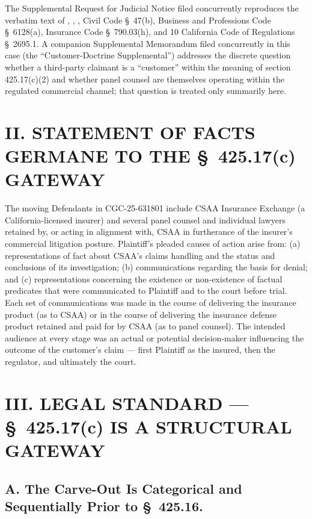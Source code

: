 The Supplemental Request for Judicial Notice filed concurrently reproduces the verbatim text of , , , Civil Code \S~47(b), Business and Professions Code \S~6128(a), Insurance Code \S~790.03(h), and 10 California Code of Regulations \S~2695.1. A companion Supplemental Memorandum filed concurrently in this case (the ``Customer-Doctrine Supplemental'') addresses the discrete question whether a third-party claimant is a ``customer'' within the meaning of section 425.17(c)(2) and whether panel counsel are themselves operating within the regulated commercial channel; that question is treated only summarily here.

\section*{II. STATEMENT OF FACTS GERMANE TO THE \S~425.17(c) GATEWAY}

The moving Defendants in CGC-25-631801 include CSAA Insurance Exchange (a California-licensed insurer) and several panel counsel and individual lawyers retained by, or acting in alignment with, CSAA in furtherance of the insurer's commercial litigation posture. Plaintiff's pleaded causes of action arise from: (a) representations of fact about CSAA's claims handling and the status and conclusions of its investigation; (b) communications regarding the basis for denial; and (c) representations concerning the existence or non-existence of factual predicates that were communicated to Plaintiff and to the court before trial. Each set of communications was made in the course of delivering the insurance product (as to CSAA) or in the course of delivering the insurance defense product retained and paid for by CSAA (as to panel counsel). The intended audience at every stage was an actual or potential decision-maker influencing the outcome of the customer's claim --- first Plaintiff as the insured, then the regulator, and ultimately the court.

\section*{III. LEGAL STANDARD --- \S~425.17(c) IS A STRUCTURAL GATEWAY}

\subsection*{A. The Carve-Out Is Categorical and Sequentially Prior to \S~425.16.}

